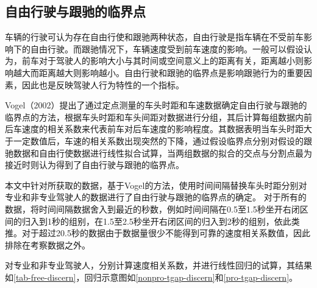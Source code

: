 \subsection{自由行驶与跟驰的临界点}

车辆的行驶可认为存在自由行使和跟驰两种状态，自由行驶是指车辆在不受前车影响下的自由行驶。而跟驰情况下，车辆速度受到前车速度的影响。一般可以假设认为，前车对于驾驶人的影响大小与其时间或空间意义上的距离有关，距离越小则影响越大而距离越大则影响越小。自由行驶和跟驰的临界点是影响跟驰行为的重要因素，因此也是反映驾驶人行为特性的一个指标。

Vogel（2002）\cite{Vogel2002}提出了通过定点测量的车头时距和车速数据确定自由行驶与跟驰的临界点的方法，根据车头时距和车头间距对数据进行分组，其后计算每组数据内前后车速度的相关系数来代表前车对后车速度的影响程度。其数据表明当车头时距大于一定数值后，车速的相关系数出现突然的下降，通过假设临界点分别对假设的跟驰数据和自由行使数据进行线性拟合试算，当两组数据的拟合的交点与分割点最为接近时则认为得到了自由行驶与跟驰的临界点。

本文中针对所获取的数据，基于Vogel的方法，使用时间间隔替换车头时距分别对专业和非专业驾驶人的数据进行了自由行驶与跟驰的临界点的确定。
对于所有的数据，将时间间隔数据舍入到最近的秒数，例如时间间隔在0.5至1.5秒坐开右闭区间的归入到1秒的组别，在1.5至2.5秒坐开右闭区间的归入到2秒的组别，依此类推。对于超过20.5秒的数据由于数据量很少不能得到可靠的速度相关系数值，因此排除在考察数据之外。

对专业和非专业驾驶人，分别计算速度相关系数，并进行线性回归的试算，其结果如\autoref{tab-free-discern}，回归示意图如\autoref{nonpro-tgap-discern}和\autoref{pro-tgap-discern}。

